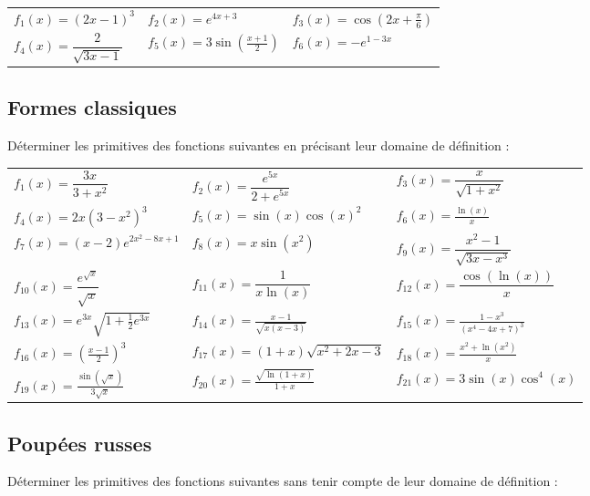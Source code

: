 \documentclass[oneside,12pt]{book}          %
\begin{document}
\renewcommand{\arraystretch}{1.4}
\begin{tabular}{ p{} p{} p{} }

    $f_{1}(x)=(2x-1)^{3}$ & $f_{2}(x)=e^{4x+3}$ & $f_{3}(x)=\cos{(2x+\frac{\pi}{6})}$ \\
    
    $f_{4}(x)=\dfrac{2}{\sqrt{3x-1}}$ & $f_{5}(x)=3\sin{\left(\frac{x+1}{2}\right)}$ & $f_{6}(x)=-e^{1-3x}$ \\
\end{tabular}



\subsection{Formes classiques}
  Déterminer les primitives des fonctions suivantes en précisant leur domaine de définition : 

\renewcommand{\arraystretch}{2}
\begin{tabular}{ p{} p{} p{} }
    $f_1(x)=\dfrac{3x}{3+x^2}$ & $f_2(x)=\dfrac{e^{5x}}{2+e^{5x}}$ & $f_3(x)=\dfrac{x}{\sqrt{1+x^2}}$ \\
    
    $f_4(x)=2x\left(3-x^2\right)^3$ & $f_5(x)=\sin(x)\cos(x)^2$ & $f_6(x)=\frac{\ln(x)}{x}$ \\
    
    $f_7(x)=(x-2)e^{2x^2-8x+1}$ & $f_8(x)=x\sin(x^2)$ & $f_9(x)=\dfrac{x^2-1}{\sqrt{3x-x^3}}$ \\
    
    $f_{10}(x)=\dfrac{e^{\sqrt{x}}}{\sqrt{x}}$ & $f_{11}(x)=\dfrac{1}{x\ln(x)}$ & $f_{12}(x)=\dfrac{\cos(\ln(x))}{x}$ \\
    
    $f_{13}(x)=e^{3x}\sqrt{1+\frac{1}{2}e^{3x}}$ & $f_{14}(x)=\frac{x-1}{\sqrt{x(x-3)}}$ & $f_{15}(x)=\frac{1-x^3}{(x^4-4x+7)^3}$ \\
    
    $f_{16}(x)=\left(\frac{x-1}{2}\right)^3$ & $f_{17}(x)=(1+x)\sqrt{x^2+2x-3} $ & $f_{18}(x)= \frac{x^2+\ln(x^2)}{x}$ \\
    
    $f_{19}(x)= \frac{\sin\left(\sqrt{x}\right)}{3\sqrt{x}}$ & $f_{20}(x)= \frac{\sqrt{\ln(1+x)}}{1+x} $ & $f_{21}(x)=3\sin(x)\cos^4(x)$
\end{tabular}



\subsection{Poupées russes}
Déterminer les primitives des fonctions suivantes sans tenir compte de leur domaine de définition :
\end{document}

